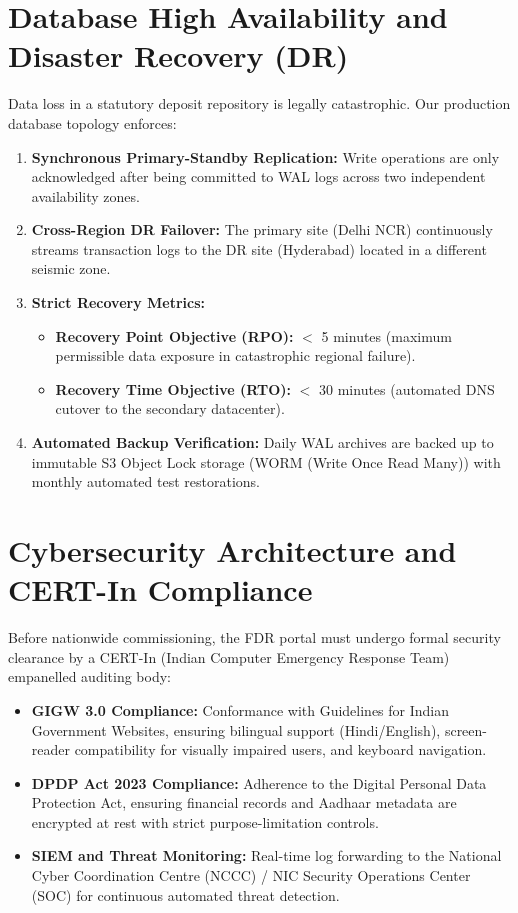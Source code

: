 \documentclass[12pt, a4paper]{report}
\begin{document}
\section{Database High Availability and Disaster Recovery (DR)}

Data loss in a statutory deposit repository is legally catastrophic. Our production database topology enforces:
\begin{enumerate}[leftmargin=2em]
  \item \textbf{Synchronous Primary-Standby Replication:} Write operations are only acknowledged after being committed to WAL logs across two independent availability zones.
  \item \textbf{Cross-Region DR Failover:} The primary site (Delhi NCR) continuously streams transaction logs to the DR site (Hyderabad) located in a different seismic zone.
  \item \textbf{Strict Recovery Metrics:}
    \begin{itemize}
      \item \textbf{Recovery Point Objective (RPO):} $<$ 5 minutes (maximum permissible data exposure in catastrophic regional failure).
      \item \textbf{Recovery Time Objective (RTO):} $<$ 30 minutes (automated DNS cutover to the secondary datacenter).
    \end{itemize}
  \item \textbf{Automated Backup Verification:} Daily WAL archives are backed up to immutable S3 Object Lock storage (WORM (Write Once Read Many)) with monthly automated test restorations.
\end{enumerate}

\section{Cybersecurity Architecture and CERT-In Compliance}

Before nationwide commissioning, the FDR portal must undergo formal security clearance by a CERT-In (Indian Computer Emergency Response Team) empanelled auditing body:
\begin{itemize}[leftmargin=2em]
  \item \textbf{GIGW 3.0 Compliance:} Conformance with Guidelines for Indian Government Websites, ensuring bilingual support (Hindi/English), screen-reader compatibility for visually impaired users, and keyboard navigation.
  \item \textbf{DPDP Act 2023 Compliance:} Adherence to the Digital Personal Data Protection Act, ensuring financial records and Aadhaar metadata are encrypted at rest with strict purpose-limitation controls.
  \item \textbf{SIEM and Threat Monitoring:} Real-time log forwarding to the National Cyber Coordination Centre (NCCC) / NIC Security Operations Center (SOC) for continuous automated threat detection.
\end{itemize}
\end{document}
